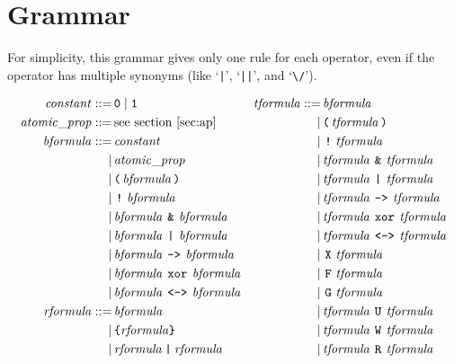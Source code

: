 \documentclass[a4paper,twoside,10pt,DIV=12,draft]{scrreprt}
\DeclareMathOperator{\F}{\texttt{F}}
\DeclareMathOperator{\G}{\texttt{G}}
\newcommand{\U}{\mathbin{\texttt{U}}}
\newcommand{\R}{\mathbin{\texttt{R}}}
\DeclareMathOperator{\X}{\texttt{X}}
\newcommand{\W}{\mathbin{\texttt{W}}}
\DeclareMathOperator{\NOT}{\texttt{!}}
\newcommand{\XOR}{\mathbin{\texttt{xor}}}
\newcommand{\IMPLIES}{\mathbin{\texttt{->}}}
\newcommand{\EQUIV}{\mathbin{\texttt{<->}}}
\newcommand{\OR}{\mathbin{\texttt{|}}}
\newcommand{\AND}{\mathbin{\texttt{\&}}}
\newcommand{\0}{\texttt{0}}
\newcommand{\1}{\texttt{1}}
\newcommand\samp[1]{`\texttt{#1}'}
\newcommand\tsamp[1]{\text{\texttt{#1}}}
\newcommand\msamp[1]{#1}
\begin{document}
\chapter{Grammar}

For simplicity, this grammar gives only one rule for each
operator, even if the operator has multiple synonyms (like \samp{|},
\samp{||}, and {`\verb=\/='}).

\begin{align*}
  \mathit{constant} ::=&\, \0 \mid \1                             &  \mathit{tformula} ::=&\,\mathit{bformula}\\
  \mathit{atomic\_prop} ::=&\, \text{see section~\ref{sec:ap}}    &    \mid&\,\tsamp{(}\,\mathit{tformula}\,\tsamp{)} \\
  \mathit{bformula} ::=&\, \mathit{constant}                      &    \mid&\,\msamp{\NOT}\,\mathit{tformula}\,\\
    \mid&\,\mathit{atomic\_prop}                                  &    \mid&\,\mathit{tformula}\,\msamp{\AND}\,\mathit{tformula} \\
    \mid&\,\tsamp{(}\,\mathit{bformula}\,\tsamp{)}                &    \mid&\,\mathit{tformula}\,\msamp{\OR}\,\mathit{tformula} \\
    \mid&\,\msamp{\NOT}\,\mathit{bformula}                        &    \mid&\,\mathit{tformula}\,\msamp{\IMPLIES}\,\mathit{tformula} \\
    \mid&\,\mathit{bformula}\,\msamp{\AND}\,\mathit{bformula}     &    \mid&\,\mathit{tformula}\,\msamp{\XOR}\,\mathit{tformula} \\
    \mid&\,\mathit{bformula}\,\msamp{\OR}\,\mathit{bformula}      &    \mid&\,\mathit{tformula}\,\msamp{\EQUIV}\,\mathit{tformula} \\
    \mid&\,\mathit{bformula}\,\msamp{\IMPLIES}\,\mathit{bformula} &    \mid&\,\msamp{\X}\,\mathit{tformula}\\
    \mid&\,\mathit{bformula}\,\msamp{\XOR}\,\mathit{bformula}     &    \mid&\,\msamp{\F}\,\mathit{tformula}\\
    \mid&\,\mathit{bformula}\,\msamp{\EQUIV}\,\mathit{bformula}   &    \mid&\,\msamp{\G}\,\mathit{tformula}\\
  \mathit{rformula} ::=&\, \mathit{bformula}                      &    \mid&\,\mathit{tformula}\,\msamp{\U}\,\mathit{tformula} \\
    \mid&\,\tsamp{\{}\mathit{rformula}\tsamp{\}}                  &    \mid&\,\mathit{tformula}\,\msamp{\W}\,\mathit{tformula} \\
    \mid&\,\mathit{rformula}\msamp{\OR}\mathit{rformula}          &    \mid&\,\mathit{tformula}\,\msamp{\R}\,\mathit{tformula} \\

\end{align*}
\end{document}
